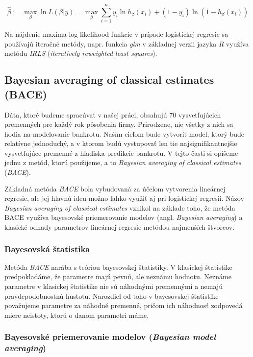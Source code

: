 \[
\hat{\beta} := \max_{\beta} \ln L(\beta | y) = \max_{\beta} \sum_{i = 1}^n y_i \ln{h_{\beta}(x_i)} + (1 - y_i) \ln{(1 - h_{\beta}(x_i))}
\]

Na nájdenie maxima log-likelihood funkcie v prípade logistickej regresie sa používajú iteračné metódy,
napr. funkcia \emph{glm} v základnej verzii jazyka \emph{R} využíva metódu \emph{IRLS} (\emph{iteratively reweighted least squares}).

\subsection{Bayesian averaging of classical estimates (BACE)}

Dáta, ktoré budeme spracúvať v našej práci, obsahujú 70 vysvetľujúcich premenných pre každý rok pôsobenia firmy.
Prirodzene, nie všetky z nich sa hodia na modelovanie bankrotu.
Naším cieľom bude vytvoriť model, ktorý bude relatívne jednoduchý, a v ktorom budú vystupovať len tie najsignifikantnejšie vysvetľujúce premenné z hľadiska predikcie bankrotu.
V tejto časti si opíšeme jednu z metód, ktorú použijeme, a to \emph{Bayesian averaging of classical estimates} (\emph{BACE}).

Základná metóda \emph{BACE} bola vybudovaná za účelom vytvorenia lineárnej regresie, ale jej hlavnú ideu možno ľahko využiť aj pri logistickej regresii.
Názov \emph{Bayesian averaging of classical estimates} vznikol na základe toho, že metóda BACE využíva bayesovské priemerovanie modelov (angl. \emph{Bayesian averaging}) a klasické odhady parametrov lineárnej regresie metódou najmenších štvorcov.

\subsubsection{Bayesovská štatistika}

Metóda \emph{BACE} narába s teóriou bayesovskej štatistiky.
V klasickej štatistike predpokladáme, že parametre majú pevnú, ale neznámu hodnotu.
Neznáme parametre v klasickej štatistike nie sú náhodnými premennými a nemajú pravdepodobnostnú hustotu.
Narozdiel od toho v bayesovskej štatistike považujeme parametre za náhodné premenné, pričom ich náhodnosť zodpovedá miere neistoty, ktorú o danom parametri máme.

\subsubsection{Bayesovské priemerovanie modelov (\emph{Bayesian model averaging})}

